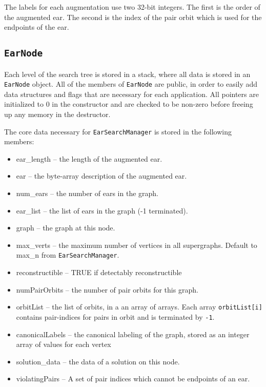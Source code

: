 \documentclass[11pt]{article}
\begin{document}
The labels for each augmentation use two 32-bit integers.
The first is the order of the augmented ear.
The second is the index of the pair orbit which is used for
	the endpoints of the ear.

\subsection{\texttt{EarNode}}

Each level of the search tree is stored in a stack, where all data is stored in
	an \texttt{EarNode} object.
All of the members of \texttt{EarNode} are public, in order to easily add data
	structures and flags that are necessary for each application.
All pointers are initialized to $0$ in the constructor and
	are checked to be non-zero before freeing up any memory in the destructor.

The core data necessary for \texttt{EarSearchManager} is stored in 
	the following members:
	
\begin{itemize}
	\item ear\_length -- the length of the augmented ear.
	 

	\item ear -- the byte-array description of the augmented ear.
	 

	\item num\_ears -- the number of ears in the graph.
	 
	\item ear\_list -- the list of ears in the graph (-1 terminated).
	 

	\item graph -- the graph at this node.
	 
	\item max\_verts -- the maximum number of vertices in
	 all supergraphs. Default to max\_n from \texttt{EarSearchManager}.
	 

	\item 
	 reconstructible -- TRUE if detectably reconstructible
	 
	\item numPairOrbits -- the number of pair orbits for this graph.
	 
	 
	\item orbitList -- the list of orbits, in a an array of arrays.
		Each array \texttt{orbitList[i]} contains pair-indices for
			pairs in orbit and is terminated by \texttt{-1}.

	\item canonicalLabels -- the canonical labeling of the graph, 
		stored as an integer array of values for each vertex

	\item solution\_data -- the data of a solution on this node.
	 

	\item violatingPairs -- A set of pair indices which cannot be endpoints of an ear.
	 
\end{itemize}
\end{document}
